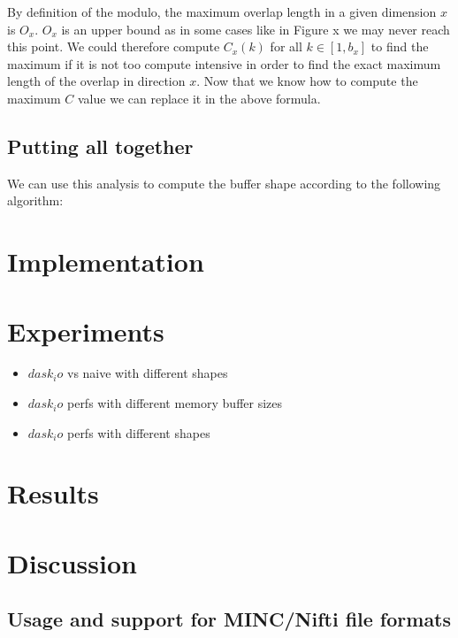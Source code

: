 \documentclass[conference]{IEEEtran}
\begin{document}
By definition of the modulo, the maximum overlap length in a given dimension $x$ is $O_x$.
$O_x$ is an upper bound as in some cases like in Figure x we may never reach this point.
We could therefore compute $C_x(k)$ for all $k \in [1, b_x]$ to find the maximum if it is not too compute intensive in order to find the exact maximum length of the overlap in direction $x$. Now that we know how to compute the maximum $C$ value we can replace it in the above formula.

\subsection{Putting all together}
We can use this analysis to compute the buffer shape according to the following algorithm:

\section*{Implementation}

\section*{Experiments}

\begin{itemize}
  \item $dask_io$ vs naive with different shapes
  \item $dask_io$ perfs with different memory buffer sizes
  \item $dask_io$ perfs with different shapes
\end{itemize}

\section*{Results}

\section*{Discussion}

\subsection{Usage and support for MINC/Nifti file formats}
\end{document}
